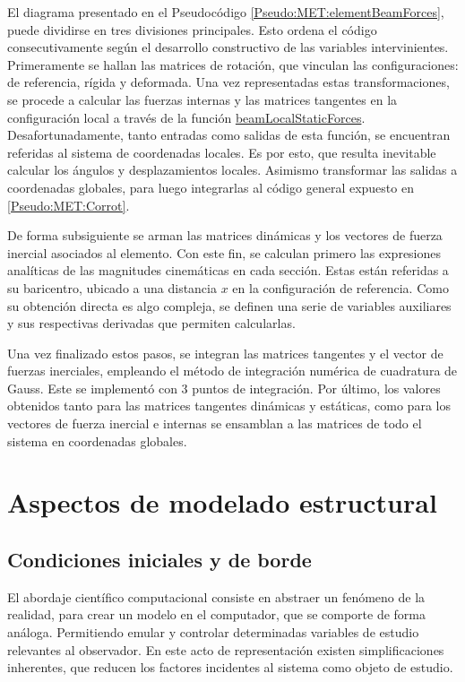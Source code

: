 El diagrama presentado en el Pseudocódigo \ref{Pseudo:MET:elementBeamForces}, puede dividirse en tres divisiones principales. Esto ordena el código consecutivamente según el desarrollo constructivo de las variables intervinientes. Primeramente se hallan las matrices de rotación, que vinculan las configuraciones: de referencia, rígida y deformada. Una vez representadas estas transformaciones, se procede a calcular las fuerzas internas y las matrices tangentes en la configuración local a través de la función \href{https://github.com/ONSAS/ONSAS/blob/master/src/beamLocalStaticForces.m}{beamLocalStaticForces}. Desafortunadamente, tanto entradas como salidas de esta función, se encuentran referidas al sistema de coordenadas locales. Es por esto, que resulta inevitable calcular los ángulos y desplazamientos locales. Asimismo transformar las salidas a coordenadas globales, para luego integrarlas al código general expuesto en \ref{Pseudo:MET:Corrot}.

De forma subsiguiente se arman las matrices dinámicas y los vectores de fuerza inercial asociados al elemento. Con este fin, se calculan primero las expresiones analíticas de las magnitudes cinemáticas en cada sección. Estas están referidas a su baricentro, ubicado a una distancia $x$ en la configuración de referencia. Como su obtención directa es algo compleja, se definen una serie de variables auxiliares y sus respectivas derivadas que permiten calcularlas.  

Una vez finalizado estos pasos, se integran las matrices tangentes y el vector de fuerzas inerciales, empleando el método de integración numérica de cuadratura de Gauss. Este se implementó con 3 puntos de integración. Por último, los valores obtenidos tanto para las matrices tangentes dinámicas y estáticas,  como para los vectores de fuerza inercial e internas se ensamblan a las matrices de todo el sistema en coordenadas globales.
 
\section{Aspectos de modelado estructural}
\subsection{Condiciones iniciales y de borde}
El abordaje científico computacional consiste en abstraer un fenómeno de la realidad, para crear un modelo en el computador, que se comporte de forma análoga. Permitiendo emular y controlar determinadas variables de estudio relevantes al observador. En este acto de representación existen simplificaciones inherentes, que reducen los factores incidentes al sistema como objeto de estudio. 

